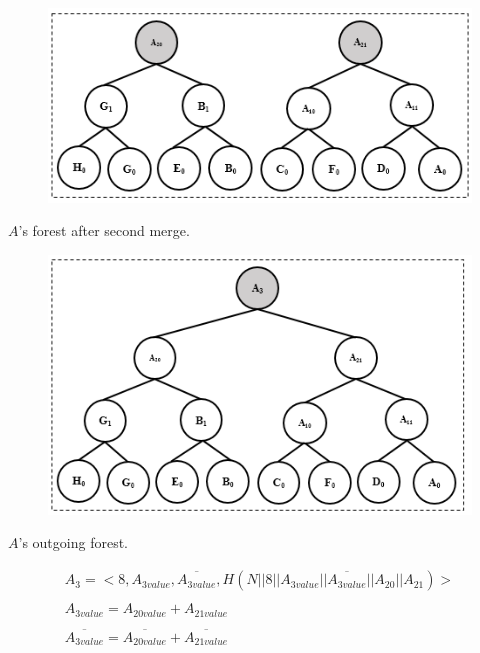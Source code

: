 \documentclass[%
  slidesonly,%
  semlayer%
  ]{seminar}                                  %
\begin{document}
\begin{slide}
\begin{figure}
        \centering
        \includegraphics[scale = 0.4]{images/a-forest-second-merge-shia.png}
      \end{figure}
      \begin{tiny}
      \begin{center}
          $A$'s forest after second merge.
      \end{center}
      \end{tiny}
      \begin{figure}
        \centering
        \includegraphics[scale = 0.4]{images/a-payload-shia.png}
      \end{figure}
      \begin{tiny}
        \begin{center}
            $A$'s outgoing forest.
        \end{center}
      \end{tiny}

      \begin{tiny}
      \begin{equation*}
        \begin{array}{l}
          A_{3} = <8, A_{3value}, \overline{A_{3value}}, H(N || 8 || A_{3value} || \overline{A_{3value}} || A_{20} ||A_{21}) >\\
          \\
          A_{3value} = A_{20value} + A_{21value}\\
          \\
          \overline{A_{3value}} = \overline{A_{20value}} + \overline{A_{21value}}
        \end{array}
      \end{equation*}
      \end{tiny}
      \vfill
      \clearpage


\end{slide}
\end{document}
